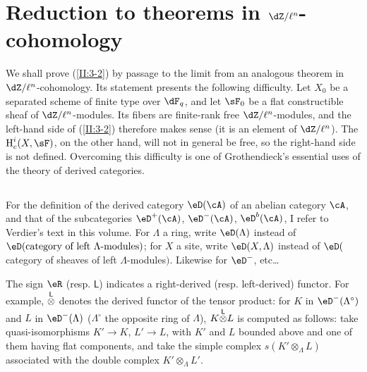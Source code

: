 \section{Reduction to theorems in \texorpdfstring{$\dZ/\ell^n$}{Z/l n}-cohomology}\label{II:4}

We shall prove (\ref{II:3-2}) by passage to the limit from an analogous
theorem in $\dZ/\ell^n$-cohomology. Its statement presents the following
difficulty. Let $X_0$ be a separated scheme of finite type over $\dF_q$, and
let $\sF_0$ be a flat constructible sheaf of $\dZ/\ell^n$-modules. Its fibers
are finite-rank free $\dZ/\ell^n$-modules, and the left-hand side of
(\ref{II:3-2}) therefore makes sense (it is an element of $\dZ/\ell^n$).
The $\h_c^i(X,\sF)$, on the other hand, will not in general be free, so the
right-hand side is not defined. Overcoming this difficulty is one of
Grothendieck's essential uses of the theory of derived categories.






\subsection{}\label{II:4-1}

For the definition of the derived category $\eD(\cA)$ of an abelian category
$\cA$, and that of the subcategories $\eD^+(\cA)$, $\eD^-(\cA)$,
$\eD^b(\cA)$, I refer to Verdier's text in this volume. For $\Lambda$ a ring,
write $\eD(\Lambda)$ instead of
$\eD(\text{category of left $\Lambda$-modules})$; for $X$ a site, write
$\eD(X,\Lambda)$ instead of
$\eD($category of sheaves of left $\Lambda$-modules$)$. Likewise for
$\eD^-$, etc\ldots

The sign $\eR$ (resp. $\mathsf{L}$) indicates a right-derived (resp.
left-derived) functor. For example, ${\overset{\mathsf{L}}{\otimes}}$ denotes the derived functor of
the tensor product: for $K$ in $\eD^-(\Lambda^\circ)$ and $L$ in
$\eD^-(\Lambda)$ ($\Lambda^\circ$ the opposite ring of $\Lambda$),
$K{\overset{\mathsf{L}}{\otimes}} L$ is computed as follows: take quasi-isomorphisms $K'\to K$,
$L'\to L$, with $K'$ and $L$ bounded above and one of them having flat
components, and take the simple complex $s(K'\otimes_\Lambda L)$ associated
with the double complex $K'\otimes_\Lambda L'$.






\subsection{}\label{II:4-2}

